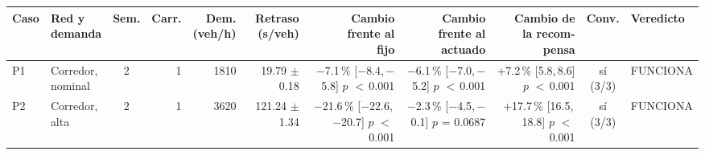 \begin{table}[H]
\centering
\scriptsize
\setlength{\tabcolsep}{1.5pt}
\begin{tabular}{llcrrrrrrcl}
\toprule
Caso & \makecell[l]{Red y\\demanda} & Sem. & Carr. & \makecell{Dem.\\(veh/h)} & \makecell{Retraso\\(s/veh)} & \makecell{Cambio\\frente al\\fijo} & \makecell{Cambio\\frente al\\actuado} & \makecell{Cambio de\\la recom-\\pensa} & Conv. & Veredicto \\
\midrule
P1 & \makecell[l]{Corredor,\\{}nominal} & 2 & 1 & 1810 & \makecell[r]{19.79\\{}$\pm$ 0.18} & \makecell[r]{$-$7.1\,\%\\{}[$-$8.4,\,$-$5.8]\\$p$ $<$\,0.001} & \makecell[r]{$-$6.1\,\%\\{}[$-$7.0,\,$-$5.2]\\$p$ $<$\,0.001} & \makecell[r]{+7.2\,\%\\{}[5.8,\,8.6]\\$p$ $<$\,0.001} & \makecell[c]{sí\\{}(3/3)} & FUNCIONA \\
P2 & \makecell[l]{Corredor,\\{}alta} & 2 & 1 & 3620 & \makecell[r]{121.24\\{}$\pm$ 1.34} & \makecell[r]{$-$21.6\,\%\\{}[$-$22.6,\,$-$20.7]\\$p$ $<$\,0.001} & \makecell[r]{$-$2.3\,\%\\{}[$-$4.5,\,$-$0.1]\\$p$ = 0.0687} & \makecell[r]{+17.7\,\%\\{}[16.5,\,18.8]\\$p$ $<$\,0.001} & \makecell[c]{sí\\{}(3/3)} & FUNCIONA \\

\end{tabular}
\end{table}
